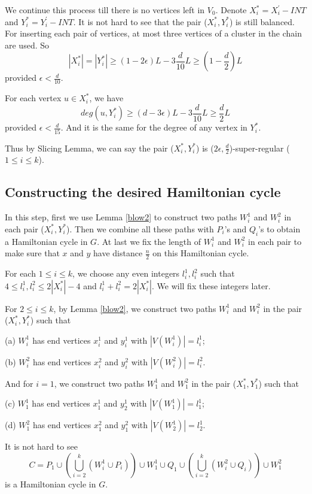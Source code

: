 \documentclass[11pt]{article}
\begin{document}
We continue this process till there is no vertices left in $V_0$. Denote $X_i^{*}=X_i^{'}-INT$ and $Y_i^{*}=Y_i^{'}-INT$. It is not hard to see that the pair ($X_i^{*},Y_i^{*}$) is still balanced. For inserting each pair of vertices, at most three vertices of a cluster in the chain are used. So $$|X_i^{*}|=|Y_i^{*}|\geq (1-2\epsilon )L-3\frac{d}{10}L\geq (1-\frac{d}{2})L$$
provided $\epsilon <\frac{d}{10}$.

For each vertex $u\in X_i^{*}$, we have
$$deg(u,Y_i^{*})\geq (d-3\epsilon )L-3\frac{d}{10}L\geq \frac{d}{2}L$$
provided $\epsilon <\frac{d}{15}$. And it is the same for the degree of any vertex in $Y_i^{*}$.

Thus by Slicing Lemma, we can say the pair ($X_i^{*},Y_i^{*}$) is ($2\epsilon ,\frac{d}{2}$)-super-regular ($1\leq i\leq k$).


\subsection{Constructing the desired Hamiltonian cycle}

In this step, first we use Lemma \ref{blow2} to construct two paths $W_i^1$ and $W_i^2$ in each pair ($X_i^*,Y_i^*$). Then we combine all these paths with $P_i$'s and $Q_i$'s to obtain a Hamiltonian cycle in $G$. At last we fix the length of $W_i^1$ and $W_i^2$ in each pair to make sure that $x$ and $y$ have distance $\frac{n}{2}$ on this Hamiltonian cycle.

For each $1\leq i\leq k$, we choose any even integers $l_i^1,l_i^2$ such that $4\leq l_i^1,l_i^2\leq 2|X_i^*|-4$ and $l_i^1+l_i^2=2|X_i^*|$. We will fix these integers later.

For $2\leq i\leq k$, by Lemma \ref{blow2}, we construct two paths $W_i^1$ and $W_i^2$ in the pair ($X_i^*,Y_i^*$) such that

\noindent
(a) $W_i^1$ has end vertices $x_i^1$ and $y_i^1$ with $|V(W_i^1)|=l_i^1$;

\noindent
(b) $W_i^2$ has end vertices $x_i^2$ and $y_i^2$ with $|V(W_i^2)|=l_i^2$.

And for $i=1$, we construct two paths $W_1^1$ and $W_1^2$ in the pair ($X_1^*,Y_1^*$) such that

\noindent
(c) $W_1^1$ has end vertices $x_1^1$ and $y_2^1$ with $|V(W_1^1)|=l_1^1$;

\noindent
(d) $W_1^2$ has end vertices $x_1^2$ and $y_1^2$ with $|V(W_2^1)|=l_2^1$.

It is not hard to see
$$C=P_1\cup (\bigcup_{i=2}^k (W_i^1\cup P_i))\cup W_1^1\cup Q_1\cup (\bigcup_{i=2}^k (W_i^2\cup Q_i))\cup W_1^2$$
is a Hamiltonian cycle in $G$.
\end{document}
